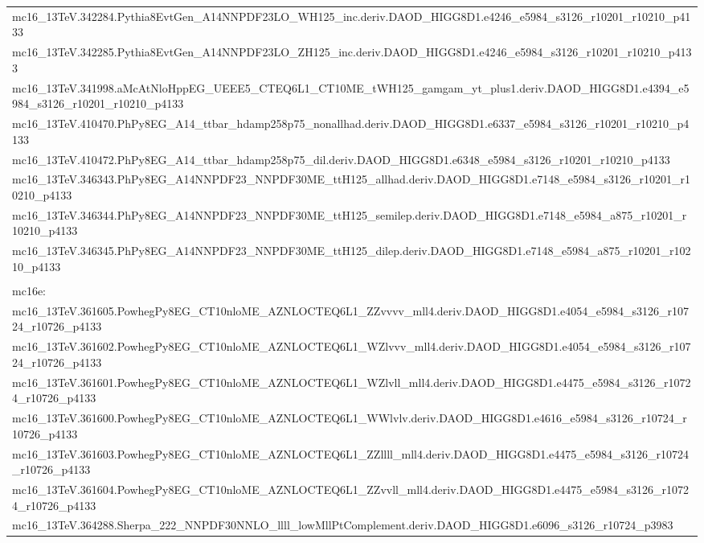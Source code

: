 \begin{adjustwidth}{-3em}{-3em}
\begin{longtable}{l}
mc16\_13TeV.342284.Pythia8EvtGen\_A14NNPDF23LO\_WH125\_inc.deriv.DAOD\_HIGG8D1.e4246\_e5984\_s3126\_r10201\_r10210\_p4133 \\
mc16\_13TeV.342285.Pythia8EvtGen\_A14NNPDF23LO\_ZH125\_inc.deriv.DAOD\_HIGG8D1.e4246\_e5984\_s3126\_r10201\_r10210\_p4133 \\
mc16\_13TeV.341998.aMcAtNloHppEG\_UEEE5\_CTEQ6L1\_CT10ME\_tWH125\_gamgam\_yt\_plus1.deriv.DAOD\_HIGG8D1.e4394\_e5984\_s3126\_r10201\_r10210\_p4133 \\
mc16\_13TeV.410470.PhPy8EG\_A14\_ttbar\_hdamp258p75\_nonallhad.deriv.DAOD\_HIGG8D1.e6337\_e5984\_s3126\_r10201\_r10210\_p4133 \\
mc16\_13TeV.410472.PhPy8EG\_A14\_ttbar\_hdamp258p75\_dil.deriv.DAOD\_HIGG8D1.e6348\_e5984\_s3126\_r10201\_r10210\_p4133 \\
mc16\_13TeV.346343.PhPy8EG\_A14NNPDF23\_NNPDF30ME\_ttH125\_allhad.deriv.DAOD\_HIGG8D1.e7148\_e5984\_s3126\_r10201\_r10210\_p4133 \\
mc16\_13TeV.346344.PhPy8EG\_A14NNPDF23\_NNPDF30ME\_ttH125\_semilep.deriv.DAOD\_HIGG8D1.e7148\_e5984\_a875\_r10201\_r10210\_p4133 \\
mc16\_13TeV.346345.PhPy8EG\_A14NNPDF23\_NNPDF30ME\_ttH125\_dilep.deriv.DAOD\_HIGG8D1.e7148\_e5984\_a875\_r10201\_r10210\_p4133 \\
 \\
mc16e: \\
mc16\_13TeV.361605.PowhegPy8EG\_CT10nloME\_AZNLOCTEQ6L1\_ZZvvvv\_mll4.deriv.DAOD\_HIGG8D1.e4054\_e5984\_s3126\_r10724\_r10726\_p4133 \\
mc16\_13TeV.361602.PowhegPy8EG\_CT10nloME\_AZNLOCTEQ6L1\_WZlvvv\_mll4.deriv.DAOD\_HIGG8D1.e4054\_e5984\_s3126\_r10724\_r10726\_p4133 \\
mc16\_13TeV.361601.PowhegPy8EG\_CT10nloME\_AZNLOCTEQ6L1\_WZlvll\_mll4.deriv.DAOD\_HIGG8D1.e4475\_e5984\_s3126\_r10724\_r10726\_p4133 \\
mc16\_13TeV.361600.PowhegPy8EG\_CT10nloME\_AZNLOCTEQ6L1\_WWlvlv.deriv.DAOD\_HIGG8D1.e4616\_e5984\_s3126\_r10724\_r10726\_p4133 \\
mc16\_13TeV.361603.PowhegPy8EG\_CT10nloME\_AZNLOCTEQ6L1\_ZZllll\_mll4.deriv.DAOD\_HIGG8D1.e4475\_e5984\_s3126\_r10724\_r10726\_p4133 \\
mc16\_13TeV.361604.PowhegPy8EG\_CT10nloME\_AZNLOCTEQ6L1\_ZZvvll\_mll4.deriv.DAOD\_HIGG8D1.e4475\_e5984\_s3126\_r10724\_r10726\_p4133 \\
mc16\_13TeV.364288.Sherpa\_222\_NNPDF30NNLO\_llll\_lowMllPtComplement.deriv.DAOD\_HIGG8D1.e6096\_s3126\_r10724\_p3983

\end{longtable}
\end{adjustwidth}
